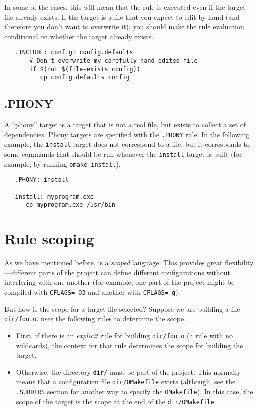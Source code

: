 In some of the cases, this will mean that the rule is executed even if the target file already
exists.  If the target is a file that you expect to edit by hand (and therefore you don't want to
overwrite it), you should make the rule evaluation conditional on whether the target already exists.

\begin{verbatim}
   .INCLUDE: config: config.defaults
       # Don't overwrite my carefully hand-edited file
       if $(not $(file-exists config))
          cp config.defaults config
\end{verbatim}

\subsection{.PHONY}

A ``phony'' target is a target that is not a real file, but exists to collect a set of dependencies.
Phony targets are specified with the \verb+.PHONY+ rule.  In the following example, the
\verb+install+ target does not correspond to a file, but it corresponds to some commands that should
be run whenever the \verb+install+ target is built (for example, by running \verb+omake install+).

\begin{verbatim}
   .PHONY: install

   install: myprogram.exe
      cp myprogram.exe /usr/bin
\end{verbatim}

\section{Rule scoping}

As we have mentioned before,  is a \emph{scoped} language.  This provides great
flexibility---different parts of the project can define different configurations without interfering
with one another (for example, one part of the project might be compiled with \verb+CFLAGS=-O3+ and
another with \verb+CFLAGS=-g+).

But how is the scope for a target file selected?  Suppose we are building a file \verb+dir/foo.o+.
 uses the following rules to determine the scope.

\begin{itemize}
\item First, if there is an \emph{explicit} rule for building \verb+dir/foo.o+ (a rule with no
wildcards), the context for that rule determines the scope for building the target.
\item Otherwise, the directory \verb+dir/+ must be part of the project.  This normally means that a
configuration file \verb+dir/OMakefile+ exists (although, see the \verb+.SUBDIRS+ section for
another way to specify the \verb+OMakefile+).  In this case, the scope of the target is the scope at
the end of the \verb+dir/OMakefile+.
\end{itemize}

